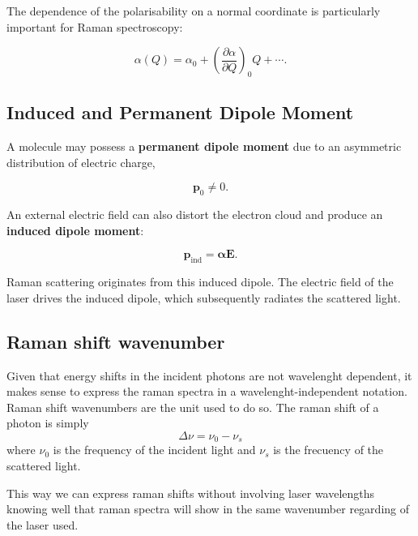 \documentclass[11pt,a4paper]{article}
\begin{document}
The dependence of the polarisability on a normal coordinate is particularly
important for Raman spectroscopy:

\begin{equation}
    \alpha(Q)
    =
    \alpha_0
    +
    \left(\frac{\partial\alpha}{\partial Q}\right)_0 Q
    + \cdots.
\end{equation}


\subsection{Induced and Permanent Dipole Moment}

A molecule may possess a \textbf{permanent dipole moment} due to an asymmetric
distribution of electric charge,

\begin{equation}
    \mathbf{p}_0 \neq 0.
\end{equation}

An external electric field can also distort the electron cloud and produce an
\textbf{induced dipole moment}:

\begin{equation}
    \mathbf{p}_{\mathrm{ind}}
    =
    \boldsymbol{\alpha}\mathbf{E}.
\end{equation}

Raman scattering originates from this induced dipole. The electric field of the
laser drives the induced dipole, which subsequently radiates the scattered light.

\subsection{Raman shift wavenumber}
\label{sec:wavenumber}
Given that energy shifts in the incident photons are not wavelenght dependent, it makes sense to express the raman spectra in a wavelenght-independent notation. Raman shift wavenumbers are the unit used to do so. The raman shift of a photon is simply
\begin{equation}
	\Delta \nu = \nu_{0} - \nu_{s}
\end{equation}
where $\nu_{0}$ is the frequency of the incident light and $\nu_{s}$ is the frecuency of the scattered light.

This way we can express raman shifts without involving laser wavelengths knowing well that raman spectra will show in the same wavenumber regarding of the laser used.
\end{document}

